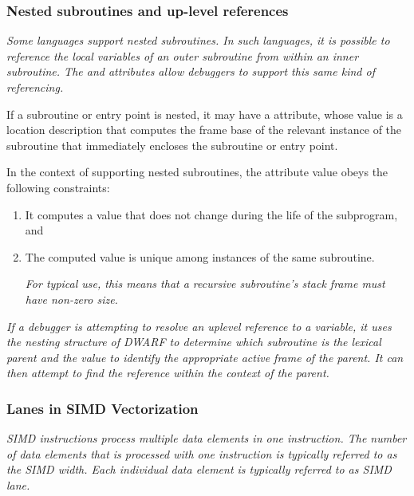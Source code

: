 \bbeb
\subsubsection{Nested subroutines and up-level references}
\label{nestedsubroutinesanduplevelreferences}
\textit{Some languages support nested subroutines. In such languages,
it is possible to reference the local variables of an
outer subroutine from within an inner subroutine. The
\DWATstaticlink{} and \DWATframebase{} attributes allow
debuggers to support this same kind of referencing.}

If\hypertarget{chap:DWATstaticlinklocationofuplevelframe}{}
a subroutine or entry point is nested, it may have a
\DWATstaticlinkDEFN{} attribute, whose value is a location
description that computes the frame base of the relevant
instance of the subroutine that immediately encloses the
subroutine or entry point.

In the context of supporting nested subroutines, the
\DWATframebase{} attribute value obeys the following constraints:

\begin{enumerate}[1. ]
\item 
It computes a value that does not change during the
life of the subprogram, and

\item The computed value is unique among instances of
the same subroutine. 

\textit{For typical \DWATframebase{} use, this
means that a recursive subroutine\textquoteright s stack frame must have
non-zero size.}

\end{enumerate}

\textit{If a debugger is attempting to resolve an up\dash level reference
to a variable, it uses the nesting structure of DWARF to
determine which subroutine is the lexical parent and the
\DWATstaticlink{} value to identify the appropriate active
frame of the parent. It can then attempt to find the reference
within the context of the parent.}

\bbeb\subsubsection{Lanes in SIMD Vectorization}
\label{chap:lanesinsimdvectorization}
\bb
\textit{SIMD instructions process multiple data elements in 
one instruction. The number of data elements that is processed 
with one instruction is typically referred to as the SIMD width. 
Each individual data element is typically referred to as SIMD lane.}

